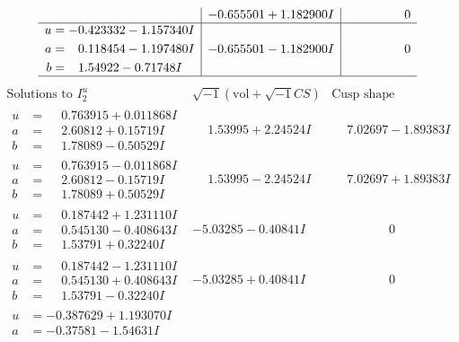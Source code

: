 \documentclass[1p]{elsarticle_modified}
\theoremstyle{definition}
\newcommand{\I}{\sqrt{-1}}
\begin{document}
$$\begin{array}{c|c|c}
 & -0.655501 + 1.182900 I & \phantom{-0.000000 } 0 \\ \hline\begin{aligned}
u &= -0.423332 - 1.157340 I \\
a &= \phantom{-}0.118454 - 1.197480 I \\
b &= \phantom{-}1.54922 - 0.71748 I\end{aligned}
 & -0.655501 - 1.182900 I & \phantom{-0.000000 } 0\\
 \hline 
 \end{array}$$\newpage$$\begin{array}{c|c|c}  
\text{Solutions to }I^u_{2}& \I (\text{vol} + \sqrt{-1}CS) & \text{Cusp shape}\\
 \hline 
\begin{aligned}
u &= \phantom{-}0.763915 + 0.011868 I \\
a &= \phantom{-}2.60812 + 0.15719 I \\
b &= \phantom{-}1.78089 - 0.50529 I\end{aligned}
 & \phantom{-}1.53995 + 2.24524 I & \phantom{-}7.02697 - 1.89383 I \\ \hline\begin{aligned}
u &= \phantom{-}0.763915 - 0.011868 I \\
a &= \phantom{-}2.60812 - 0.15719 I \\
b &= \phantom{-}1.78089 + 0.50529 I\end{aligned}
 & \phantom{-}1.53995 - 2.24524 I & \phantom{-}7.02697 + 1.89383 I \\ \hline\begin{aligned}
u &= \phantom{-}0.187442 + 1.231110 I \\
a &= \phantom{-}0.545130 - 0.408643 I \\
b &= \phantom{-}1.53791 + 0.32240 I\end{aligned}
 & -5.03285 - 0.40841 I & \phantom{-0.000000 } 0 \\ \hline\begin{aligned}
u &= \phantom{-}0.187442 - 1.231110 I \\
a &= \phantom{-}0.545130 + 0.408643 I \\
b &= \phantom{-}1.53791 - 0.32240 I\end{aligned}
 & -5.03285 + 0.40841 I & \phantom{-0.000000 } 0 \\ \hline\begin{aligned}
u &= -0.387629 + 1.193070 I \\
a &= -0.37581 - 1.54631 I \\

\end{aligned}
\end{array}$$
\end{document}
